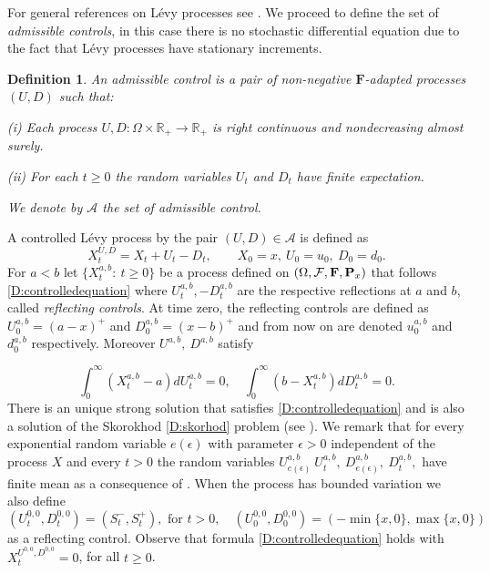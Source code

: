 \documentclass{article}
\newtheorem{definition}[thm]{Definition}
\begin{document}
For general references on L\'evy processes see \cite{B,KRI,KIS}. We proceed to define the set of \emph{admissible controls}, in this case there is no stochastic differential equation due to the fact that L\'evy processes have stationary increments. 

\begin{definition}\label{D:AdmissiblecontrolsLEVY} 
An \emph{admissible control} is a pair of non-negative $\mathbf{F}$-adapted processes $(U,D)$ such that:
\vskip1mm\par\noindent
{\rm(i)} Each process $U,D\colon\Omega \times \mathbb{R}_+ \rightarrow \mathbb{R}_+$ is right continuous and nondecreasing almost surely.
\vskip1mm\par\noindent
{\rm(ii)} For each $t\geq 0$ the random variables $U_t$ and $D_t$ have finite expectation.
%
\vskip1mm\par\noindent
%
We denote by $\mathcal{A}$ the set of admissible control.
\end{definition}
A controlled L\'evy process by the pair $(U,D) \in \mathcal{A}$ is defined as
\begin{equation}\label{D:controlledequation}
X^{U,D}_t= X_t +U_t-D_t, \qquad X_0=x,\ U_{0}=u_0,  \ D_{0}=d_0.
\end{equation}
%
%
For $a<b$ let $\lbrace X^{a,b}_t\colon \ t \geq 0 \rbrace$ be a process defined on $(
\Omega,\mathcal{F}, {\bf F},\mathbf{P
}_x)$ that follows \eqref{D:controlledequation} where 
$ U^{a,b}_t,-D^{a,b}_t$ are the respective reflections at $a$ and $b$,  called \emph{reflecting controls}.
At time zero, the reflecting controls are defined as $U^{a,b}_0=(a-x)^+$ and $D^{a,b}_0=(x-b)^+$ and from now on are denoted $u_0^{a,b}$ and $d_0^{a,b}$ respectively. Moreover $ U^{a,b}, \ D^{a,b}$ satisfy

\begin{equation}\label{D:skorhod}
     \int_0^{\infty} (X^{a,b}_t -a)dU^{a,b}_t=0, \quad \int_0^{\infty} (b- X^{a,b}_t )dD^{a,b}_t=0 . 
     \end{equation}
There is an unique strong solution that satisfies \eqref{D:controlledequation} and is also a solution of the Skorokhod \eqref{D:skorhod} problem (see \cite{AAGP}). We remark that for every exponential random variable $e(\epsilon)$ with parameter $\epsilon>0$ independent of the process $X$ and every $t>0$ the random variables $U^{a
,b}_{e(\epsilon)} \ U^{a,b}_t, \ D^{a,b}_{e(\epsilon)}, \  D^{a,b}_t, $ have finite mean as a consequence of \cite[Theorem 6.3]{AAGP}. When the process has bounded variation we also define 
$$(U^{0,0}_t,D^{0,0}_t)=(S^-_t,S^+_t ), \text{ for } t>0, \quad (U^{0,0}_0,D^{0,0}_0)= (-\min \lbrace x,0 \rbrace , \max \lbrace x,0 \rbrace) $$
as a reflecting control. Observe that formula \eqref{D:controlledequation} holds with $X_t^{U^{0,0},D^{0,0}}=0$, for all $t \geq 0$.
\end{document}
